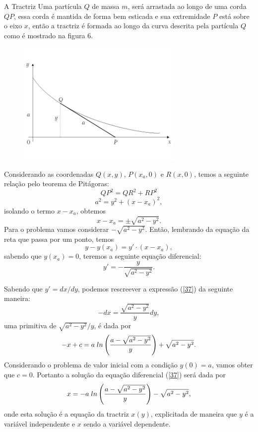 \documentclass[blue]{beamer}
\numberwithin{equation}{section}
\begin{document}
\begin{frame}{A Tractriz}
	\justifying
	\hspace{0.2cm} Uma partícula $Q$ de massa $m$, será arrastada ao longo de uma corda $QP$, essa corda é mantida de forma bem esticada e sua extremidade $P$ está sobre o eixo $x$, então a tractriz é formada ao longo da curva descrita pela partícula $Q$ como é mostrado na figura 6.
	\begin{figure}[ht!]
		\centering
		\includegraphics[width=8cm]{Figura6}
	\end{figure}
	
\end{frame}

\begin{frame}
	\justifying
	\hspace{0.2cm} Considerando as coordenadas $Q(x,y)$, $P(x_a,0)$ e $R(x,0)$, temos a seguinte relação pelo teorema de Pitágoras: 
$$QP^{2} = QR^{2} + RP^{2}$$
$$a^2 = y^2 + (x - x_a)^{2},$$
isolando o termo $x - x_a$, obtemos
$$x - x_a = \pm \sqrt{a^2 - y^2}.$$
Para o problema vamos considerar $- \sqrt{a^2 - y^2}$. Então, lembrando da equação da reta que passa por um ponto, temos 
$$y - y(x_a) = y' \cdot (x - x_a),$$
sabendo que $y(x_a) = 0$, teremos a seguinte equação diferencial:
\begin{equation} \label{37}
y' = - \dfrac{y}{\sqrt{a^{2} - y^{2}}}.
\end{equation}
\end{frame}

\begin{frame}
	\justifying
	\hspace{0.2cm} Sabendo que $y' = dx/dy$, podemos rescreever a expressão (\ref{37}) da seguinte maneira: 
	$$-dx = \dfrac{\sqrt{a^{2} - y^{2}}}{y} dy,$$ 
	uma primitiva de $\sqrt{a^{2} - y^{2}}/y$, é dada por
	$$ - x + c = a \hspace{0.1cm} ln \left(\dfrac{a - \sqrt{a^2 - y^2}}{y}\right) + \sqrt{a^2 - y^2}.$$
	\hspace{0.2cm} Considerando o problema de valor inicial com a condição $y(0) = a$, vamos obter que $c = 0$. Portanto a solução da equação diferencial (\ref{37}) será dada por
	$$x = - a \hspace{0.1cm} ln \left(\dfrac{a - \sqrt{a^2 - y^2}}{y}\right) - \sqrt{a^2 - y^2},$$
	onde esta solução é a equação da tractriz $x(y)$, explicitada de maneira que $y$ é a variável independente e $x$ sendo a variável dependente.
	
\end{frame}
\end{document}
